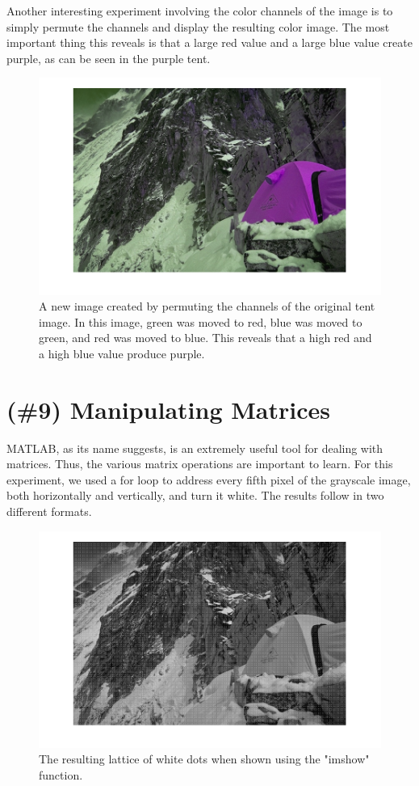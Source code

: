 \documentclass{article}
\begin{document}
Another interesting experiment involving the color channels of the image is to 
simply permute the channels and display the resulting color image. The most 
important thing this reveals is that a large red value and a large blue value 
create purple, as can be seen in the purple tent.

\begin{figure}[!ht]
	\centering
	\includegraphics[width=120mm]{figs/tent_permuted_channels.png}
	\caption{A new image created by permuting the channels of the original tent 
        image. In this image, green was moved to red, blue was moved to green, and red 
        was moved to blue. This reveals that a high red and a high blue value produce 
        purple.}
\end{figure}

\section{(\#9) Manipulating Matrices}

MATLAB, as its name suggests, is an extremely useful tool for dealing with 
matrices. Thus, the various matrix operations are important to learn. For this 
experiment, we used a for loop to address every fifth pixel of the grayscale 
image, both horizontally 
and vertically, and turn it white. The results follow in two different formats.

\begin{figure}[!ht]
	\centering
	\includegraphics[width=120mm]{figs/tent_white_dots.png}
	\caption{The resulting lattice of white dots when shown using the "imshow" 
        function.}
\end{figure}
\end{document}
